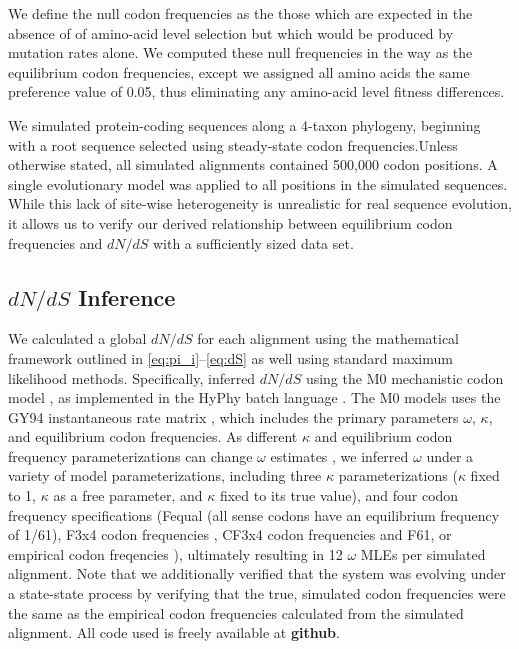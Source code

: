 \documentclass[11pt]{article}
\begin{document}
We define the null codon frequencies as the those which are expected in the absence of of amino-acid level selection but which would be produced by mutation rates alone. We computed these null frequencies in the way as the equilibrium codon frequencies, except we assigned all amino acids the same preference value of 0.05, thus eliminating any amino-acid level fitness differences.


We simulated protein-coding sequences along a 4-taxon phylogeny, beginning with a root sequence selected using steady-state codon frequencies.Unless otherwise stated, all simulated alignments contained 500,000 codon positions. A single evolutionary model was applied to all positions in the simulated sequences. While this lack of site-wise heterogeneity is unrealistic for real sequence evolution, it allows us to verify our derived relationship between equilibrium codon frequencies and $dN/dS$ with a sufficiently sized data set.



\subsection*{$dN/dS$ Inference}
We calculated a global $dN/dS$ for each alignment using the mathematical framework outlined in \eqref{eq:pi_i}--\eqref{eq:dS} as well using standard maximum likelihood methods. Specifically, inferred $dN/dS$ using the M0 mechanistic codon model \cite{Yangetal2000}, as implemented in the HyPhy batch language \cite{KosakovskyPondetal2005}. The M0 models uses the GY94 instantaneous rate matrix \cite{GoldmanYang1994,NielsenYang1998}, which includes the primary parameters $\omega$, $\kappa$, and equilibrium codon frequencies. As different $\kappa$ and equilibrium codon frequency parameterizations can change $\omega$ estimates \cite{YN00, Yang2006, ZhangYu2006}, we inferred $\omega$ under a variety of model parameterizations, including three $\kappa$ parameterizations ($\kappa$ fixed to 1, $\kappa$ as a free parameter, and $\kappa$ fixed to its true value), and four codon frequency specifications (Fequal (all sense codons have an equilibrium frequency of 1/61),  F3x4 codon frequencies \cite{MuseGaut1994}, CF3x4 codon frequencies \cite{Pond2010} and F61, or empirical codon freqencies \cite{GoldmanYang1994}), ultimately resulting in 12 $\omega$ MLEs per simulated alignment. Note that we additionally verified that the system was evolving under a state-state process by verifying that the true, simulated codon frequencies were the same as the empirical codon frequencies calculated from the simulated alignment. All code used is freely available at \textbf{github}. 
\end{document}
